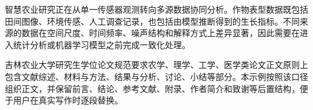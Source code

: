 智慧农业研究正在从单一传感器观测转向多源数据协同分析。作物表型数据既包括田间图像、环境传感、人工调查记录，也包括由模型推断得到的生长指标。不同来源的数据在空间尺度、时间频率、噪声结构和解释方式上差异显著，因此需要在进入统计分析或机器学习模型之前完成一致化处理。

吉林农业大学研究生学位论文规范要求农学、理学、工学、医学类论文正文原则上包含文献综述、材料与方法、结果与分析、讨论、小结等部分。本示例按照该口径组织正文，并保留前言、结论、参考文献、附录、作者简介和致谢等后置结构，便于用户在真实写作时逐段替换。
